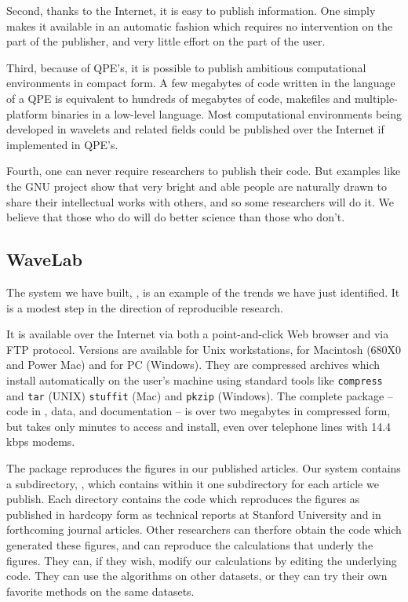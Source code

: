 Second, thanks to the Internet, it is easy to publish information.
One simply makes it available in an automatic fashion which requires no
intervention on the part of the publisher, and very little effort on
the part of the user.

Third, because of QPE's, it is possible to publish ambitious
computational environments in compact form.  A few megabytes
of code written in the language
of a QPE is equivalent to hundreds of megabytes
of code, makefiles and multiple-platform binaries in a low-level language.
Most computational environments being developed in wavelets and
related fields could be published over the Internet if implemented in QPE's.

Fourth, one can never require researchers to publish their code.
But examples like the GNU project show that very bright and
able people are naturally drawn to share their intellectual
works with others, and so some researchers will do it.  We believe
that those who do will do better science than those who don't.

\subsection{WaveLab} 

The system we have built, \WaveLab, is an example
of the trends we have just identified.
It is a modest step in the direction of reproducible research.

It is available over the Internet via both a point-and-click Web browser
and via FTP protocol.  Versions are available for Unix workstations,
for Macintosh (680X0 and Power Mac) and for PC (Windows).  They are
compressed archives which install automatically on the user's
machine using standard tools like {\tt compress} and {\tt  tar} (UNIX) 
{\tt stuffit} (Mac) and {\tt pkzip} (Windows).  
The complete package  -- code in \Matlab,
data, and documentation -- is over two megabytes in compressed form,
but takes only minutes to access and install, even over telephone
lines with 14.4 kbps modems.

The package reproduces the figures in our published articles.
Our system contains a subdirectory, \ScriptDir, which contains
within it one subdirectory for each article we publish.
Each directory 
contains the code which reproduces
the figures as published in hardcopy form
as technical reports at Stanford University and in
forthcoming journal articles.
Other researchers can therfore obtain the \Matlab code which generated
these figures, and can reproduce the calculations that
underly the figures.  They can, if they wish,
modify our calculations by editing the underlying \Matlab code.
They can use the algorithms on other datasets,
or they can try their own favorite methods on the same datasets.

